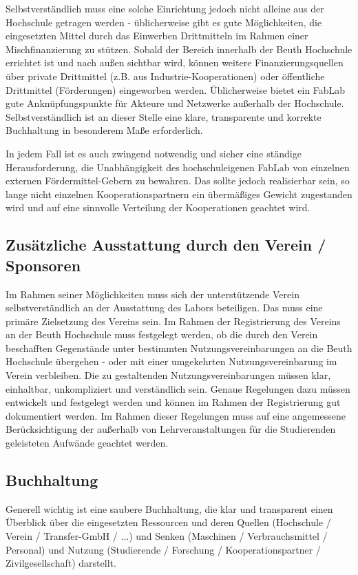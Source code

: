 \documentclass[parskip=half,headsepline,footsepline,titlepage]{scrartcl}
\begin{document}
Selbstverständlich muss eine solche Einrichtung jedoch nicht alleine aus der Hochschule getragen werden - üblicherweise gibt es gute Möglichkeiten, die eingesetzten Mittel durch das Einwerben Drittmitteln im Rahmen einer Mischfinanzierung zu stützen.
Sobald der Bereich innerhalb der Beuth Hochschule errichtet ist und nach außen sichtbar wird, können weitere Finanzierungsquellen über private Drittmittel (z.B. aus Industrie-Kooperationen) oder öffentliche Drittmittel (Förderungen) eingeworben werden. Üblicherweise bietet ein FabLab gute Anknüpfungspunkte für Akteure und Netzwerke außerhalb der Hochschule.
Selbstverständlich ist an dieser Stelle eine klare, transparente und korrekte Buchhaltung in besonderem Maße erforderlich.

In jedem Fall ist es auch zwingend notwendig und sicher eine ständige Herausforderung, die Unabhängigkeit des hochschuleigenen FabLab von einzelnen externen Fördermittel-Gebern zu bewahren. Das sollte jedoch realisierbar sein, so lange nicht einzelnen Kooperationspartnern ein übermäßiges Gewicht zugestanden wird und auf eine sinnvolle Verteilung der Kooperationen geachtet wird.


\subsection{Zusätzliche Ausstattung durch den Verein / Sponsoren}
Im Rahmen seiner Möglichkeiten muss sich der unterstützende Verein selbstverständlich an der Ausstattung des Labors beteiligen. Das muss eine primäre Zielsetzung des Vereins sein.
Im Rahmen der Registrierung des Vereins an der Beuth Hochschule muss festgelegt werden, ob die durch den Verein beschafften Gegenstände unter bestimmten Nutzungsvereinbarungen an die Beuth Hochschule übergehen - oder mit einer umgekehrten Nutzungsvereinbarung im Verein verbleiben. Die zu gestaltenden Nutzungsvereinbarungen müssen klar, einhaltbar, unkompliziert und verständlich sein.
Genaue Regelungen dazu müssen entwickelt und festgelegt werden und können im Rahmen der Registrierung gut dokumentiert werden. Im Rahmen dieser Regelungen muss auf eine angemessene Berücksichtigung der außerhalb von Lehrveranstaltungen für die Studierenden geleisteten Aufwände geachtet werden.


\subsection{Buchhaltung}
Generell wichtig ist eine saubere Buchhaltung, die klar und transparent einen Überblick über die eingesetzten Ressourcen und deren Quellen (Hochschule / Verein / Transfer-GmbH / ...) und Senken (Maschinen / Verbrauchsmittel / Personal) und Nutzung (Studierende / Forschung / Kooperationspartner / Zivilgesellschaft) darstellt.
\end{document}
